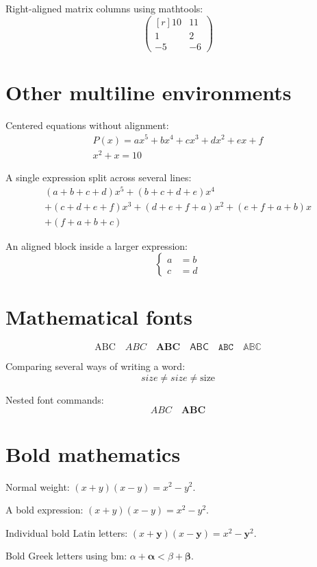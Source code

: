 \documentclass[a4paper,12pt,fleqn,leqno]{article}
\begin{document}
Right-aligned matrix columns using mathtools:
\[
\begin{pmatrix*}[r]
10 & 11 \\
1 & 2 \\
-5 & -6
\end{pmatrix*}
\]

\section{Other multiline environments}

Centered equations without alignment:
\begin{gather}
P(x)=ax^{5}+bx^{4}+cx^{3}+dx^{2}+ex+f \\
x^{2}+x=10
\end{gather}

A single expression split across several lines:
\begin{multline*}
(a+b+c+d)x^{5}+(b+c+d+e)x^{4} \\
+(c+d+e+f)x^{3}+(d+e+f+a)x^{2}+(e+f+a+b)x \\
+(f+a+b+c)
\end{multline*}

An aligned block inside a larger expression:
\[
\left\{
\begin{aligned}
a &= b \\
c &= d
\end{aligned}
\right.
\]

\section{Mathematical fonts}

\[
\mathrm{ABC}
\quad \mathit{ABC}
\quad \mathbf{ABC}
\quad \mathsf{ABC}
\quad \mathtt{ABC}
\quad \mathbb{ABC}
\]

Comparing several ways of writing a word:
\[
size \neq \mathit{size} \neq \mathrm{size}
\]

Nested font commands:
\[
\mathbf{\mathit{ABC}}
\quad
\mathit{\mathbf{ABC}}
\]

\section{Bold mathematics}

Normal weight:
$(x+y)(x-y)=x^{2}-y^{2}$.

A bold expression:
{\boldmath $(x+y)(x-y)=x^{2}-y^{2}$}.

Individual bold Latin letters:
$(x+\mathbf{y})(x-\mathbf{y})=x^{2}-\mathbf{y}^{2}$.

Bold Greek letters using bm:
$\alpha+\bm{\alpha}<\beta+\bm{\beta}$.
\end{document}
